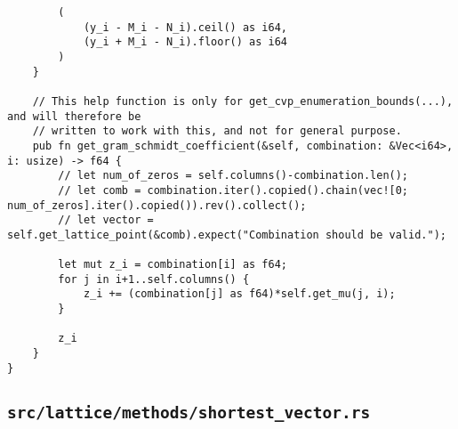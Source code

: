 \begin{verbatim}
        (
            (y_i - M_i - N_i).ceil() as i64,
            (y_i + M_i - N_i).floor() as i64
        )
    }

    // This help function is only for get_cvp_enumeration_bounds(...), and will therefore be
    // written to work with this, and not for general purpose.
    pub fn get_gram_schmidt_coefficient(&self, combination: &Vec<i64>, i: usize) -> f64 {
        // let num_of_zeros = self.columns()-combination.len();
        // let comb = combination.iter().copied().chain(vec![0; num_of_zeros].iter().copied()).rev().collect();
        // let vector = self.get_lattice_point(&comb).expect("Combination should be valid.");

        let mut z_i = combination[i] as f64;
        for j in i+1..self.columns() {
            z_i += (combination[j] as f64)*self.get_mu(j, i);
        }

        z_i
    }
}
\end{verbatim}


\subsection{\texttt{src/lattice/methods/shortest_vector.rs}}

